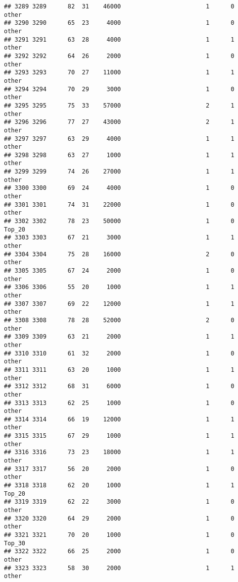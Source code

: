 \documentclass[
]{article}
\begin{document}
\begin{verbatim}
## 3289 3289      82  31    46000                        1      0    other
## 3290 3290      65  23     4000                        1      0    other
## 3291 3291      63  28     4000                        1      1    other
## 3292 3292      64  26     2000                        1      0    other
## 3293 3293      70  27    11000                        1      1    other
## 3294 3294      70  29     3000                        1      0    other
## 3295 3295      75  33    57000                        2      1    other
## 3296 3296      77  27    43000                        2      1    other
## 3297 3297      63  29     4000                        1      1    other
## 3298 3298      63  27     1000                        1      1    other
## 3299 3299      74  26    27000                        1      1    other
## 3300 3300      69  24     4000                        1      0    other
## 3301 3301      74  31    22000                        1      0    other
## 3302 3302      78  23    50000                        1      0   Top_20
## 3303 3303      67  21     3000                        1      1    other
## 3304 3304      75  28    16000                        2      0    other
## 3305 3305      67  24     2000                        1      0    other
## 3306 3306      55  20     1000                        1      1    other
## 3307 3307      69  22    12000                        1      1    other
## 3308 3308      78  28    52000                        2      0    other
## 3309 3309      63  21     2000                        1      1    other
## 3310 3310      61  32     2000                        1      0    other
## 3311 3311      63  20     1000                        1      1    other
## 3312 3312      68  31     6000                        1      0    other
## 3313 3313      62  25     1000                        1      0    other
## 3314 3314      66  19    12000                        1      1    other
## 3315 3315      67  29     1000                        1      1    other
## 3316 3316      73  23    18000                        1      1    other
## 3317 3317      56  20     2000                        1      0    other
## 3318 3318      62  20     1000                        1      1   Top_20
## 3319 3319      62  22     3000                        1      0    other
## 3320 3320      64  29     2000                        1      0    other
## 3321 3321      70  20     1000                        1      0   Top_30
## 3322 3322      66  25     2000                        1      0    other
## 3323 3323      58  30     2000                        1      1    other

\end{verbatim}
\end{document}
